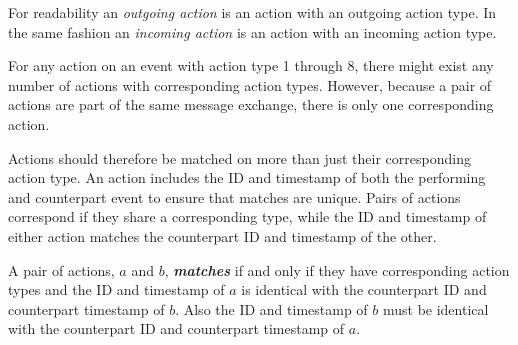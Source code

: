 	\noindent For readability an \textit{outgoing action} is an action with an outgoing action type. In the same fashion an \textit{incoming action} is an action with an incoming action type.
	
	\newpar For any action on an event with action type 1 through 8, there might exist any number of actions with corresponding action types. However, because a pair of actions are part of the same message exchange, there is only one corresponding action.
	
	Actions should therefore be matched on more than just their corresponding action type. An action includes the ID and timestamp of both the performing and counterpart event to ensure that matches are unique.
    Pairs of actions correspond if they share a corresponding type, while the ID and timestamp of either action matches the counterpart ID and timestamp of the other.
    
    \begin{definition}
    	\label{def:action:matching}
    	A pair of actions, $a$ and $b$, \textit{\textbf{matches}} if and only if they have corresponding action types and the ID and timestamp of $a$ is identical with the counterpart ID and counterpart timestamp of $b$. Also the ID and timestamp of $b$ must be identical with the counterpart ID and counterpart timestamp of $a$.
    \end{definition}
    
